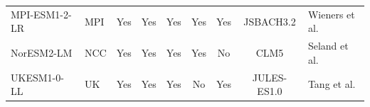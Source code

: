 \documentclass[9pt,twoside]{pnas-new}
\begin{document}
\begin{table}[ht]
\begin{tabular}{llccccccl}
MPI-ESM1-2-LR                                                          & MPI                                                                  & Yes                              & Yes                              & Yes                                                      & Yes                                                      & Yes                                                                                        & JSBACH3.2                & Wieners et al. \cite{MPI}                                            \\
NorESM2-LM                                                             & NCC                                                                  & Yes                              & Yes                              & Yes                                                      & Yes                                                      & No                                                                                         & CLM5              &Seland et al. \cite{NorESM2}\\
UKESM1-0-LL                                                            & UK                                                                   & Yes                              & Yes                              & Yes                                                      & No                                                       & Yes                                                                                        & JULES-ES1.0             & Tang et al. \cite{UKESM}                                             \\ \hline
\end{tabular}
\end{table}
\end{document}
